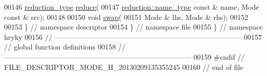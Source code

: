 \begin{DoxyCode}
00146     \hyperlink{namespacehryky_a343a9a4c36a586be5c2693156200eadc}{reduction_type} \hyperlink{namespacehryky_af41cb3af6766761da0ff21b84527a52c}{reduce}(
00147         \hyperlink{namespacehryky_1_1reduction_ac686c30a4c8d196bbd0f05629a6b921f}{reduction::name_type} \textcolor{keyword}{const} & name, Mode \textcolor{keyword}{const} & src);
00148 
00150     \textcolor{keywordtype}{void} \hyperlink{namespacehryky_a4282146df5ea2b68cb667896a2205909}{swap}(
00151         Mode & lhs, Mode & rhs);
00152 
00153 \} \textcolor{comment}{// namespace descriptor}
00154 \} \textcolor{comment}{// namespace file}
00155 \} \textcolor{comment}{// namespace hryky}
00156 \textcolor{comment}{//
      ------------------------------------------------------------------------------}
00157 \textcolor{comment}{// global function definitions}
00158 \textcolor{comment}{//
      ------------------------------------------------------------------------------}
00159 \textcolor{preprocessor}{#endif // FILE\_DESCRIPTOR\_MODE\_H\_20130209135355245}
00160 \textcolor{preprocessor}{}\textcolor{comment}{// end of file}
\end{DoxyCode}
